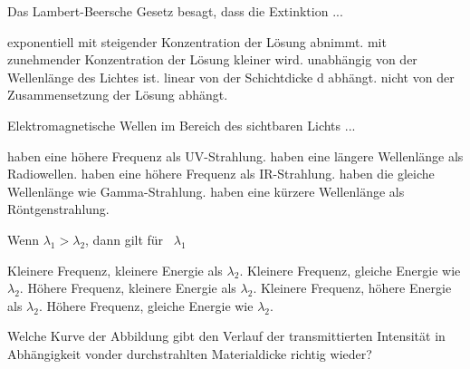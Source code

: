 \documentclass[11pt]{exam}
\begin{document}
\setlength{\voffset}{-0.5in}
\setlength{\headsep}{5pt}

\hspace{2mm}
 \hspace{5mm}
\vspace{4mm}

\begin{questions}

\question Das Lambert-Beersche Gesetz besagt, dass die Extinktion ...

\begin{choices}
	\choice exponentiell mit steigender Konzentration der Lösung abnimmt.
	\choice mit zunehmender Konzentration der Lösung kleiner wird.
	\choice unabhängig von der Wellenlänge des Lichtes ist.
	\choice linear von der Schichtdicke d abhängt.
	\choice nicht von der Zusammensetzung der Lösung abhängt.
\end{choices}

\vspace{3mm}\question Elektromagnetische Wellen im Bereich des sichtbaren Lichts ...

\begin{choices}
	\choice haben eine höhere Frequenz als UV-Strahlung.
	\choice haben eine längere Wellenlänge als Radiowellen.
	\choice haben eine höhere Frequenz als IR-Strahlung.
	\choice haben die gleiche Wellenlänge wie Gamma-Strahlung.
	\choice haben eine kürzere Wellenlänge als Röntgenstrahlung.
\end{choices}

\vspace{3mm}\question Wenn \( \lambda_1 > \lambda_2 \), dann gilt für  \( \lambda_1 \)

\begin{choices}
	\choice Kleinere Frequenz, kleinere Energie als \( \lambda_2 \).
	\choice Kleinere Frequenz, gleiche Energie wie \( \lambda_2 \).
	\choice Höhere Frequenz, kleinere Energie als \( \lambda_2 \).
	\choice Kleinere Frequenz, höhere Energie als \( \lambda_2 \).
	\choice Höhere Frequenz, gleiche Energie wie \( \lambda_2 \).
\end{choices}

\vspace{3mm}\question Welche Kurve der Abbildung gibt den Verlauf der transmittierten Intensität in Abhängigkeit vonder durchstrahlten Materialdicke richtig wieder?


\end{questions}
\end{document}
